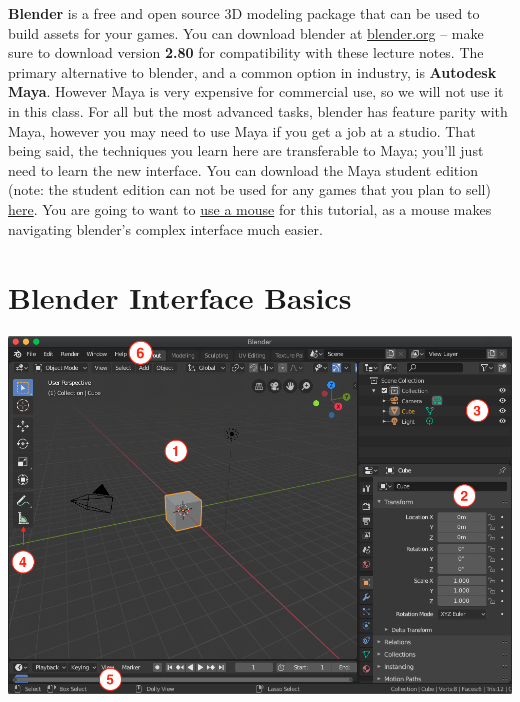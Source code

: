 \documentclass[11pt]{article}
\begin{document}
\textbf{Blender} is a free and open source 3D modeling package that can be used to build assets for
your games.  You can download blender at \href{https://blender.org}{blender.org} -- make sure to
download version {\bf 2.80} for compatibility with these lecture notes.  The primary alternative to
blender, and a common option in industry, is \textbf{Autodesk Maya}.  However Maya is very expensive
for commercial use, so we will not use it in this class.  For all but the most advanced tasks,
blender has feature parity with Maya, however you may need to use Maya if you get a job at a studio.
That being said, the techniques you learn here are transferable to Maya; you'll just need to learn
the new interface.  You can download the Maya student edition (note: the student edition can not be used
for any games that you plan to sell) \href{https://www.autodesk.com/education/free-software/maya}{here}.
You are going to want to \underline{use a mouse} for this tutorial, as a mouse makes navigating 
blender's complex interface much easier.

\section{Blender Interface Basics}

{
\centering \noindent
\includegraphics[width=1.0\textwidth]{blender-interface}
}
\end{document}
